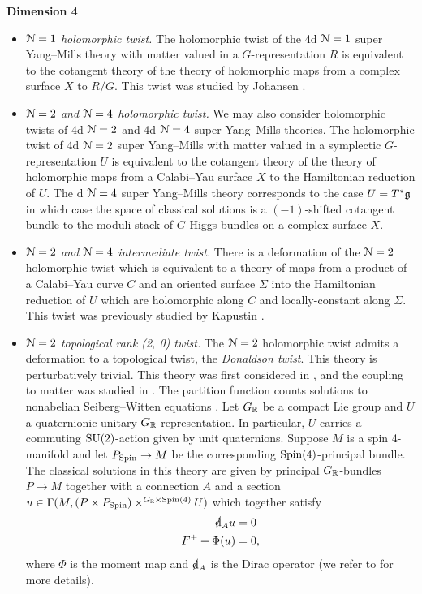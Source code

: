\documentclass[10pt, oneside]{article}
\begin{document}
\textbf{Dimension 4}
\begin{itemize}
 \item \emph{$\mathcal{N}=1$ holomorphic twist.} The holomorphic twist of the 4d $\mathcal N=1$ super Yang--Mills theory with matter valued in a $G$-representation $R$ is equivalent to the cotangent theory of the theory of holomorphic maps from a complex surface $X$ to $R/G$. This twist was studied by Johansen \cite{Johansen}.
 \item \emph{$\mathcal N=2$ and $\mathcal N=4$ holomorphic twist.} We may also consider holomorphic twists of 4d $\mathcal N=2$ and 4d $\mathcal N=4$ super Yang--Mills theories. The holomorphic twist of 4d $\mathcal N=2$ super Yang--Mills with matter valued in a symplectic $G$-representation $U$ is equivalent to the cotangent theory of the theory of holomorphic maps from a Calabi--Yau surface $X$ to the Hamiltonian reduction of $U$. The d $\mathcal N=4$ super Yang--Mills theory corresponds to the case $U=T^*\mathfrak g$ in which case the space of classical solutions is a $(-1)$-shifted cotangent bundle to the moduli stack of $G$-Higgs bundles on a complex surface $X$.
 \item \emph{$\mathcal{N}=2$ and $\mathcal{N}=4$ intermediate twist.} There is a deformation of the $\mathcal N=2$ holomorphic twist which is equivalent to a theory of maps from a product of a Calabi--Yau curve $C$ and an oriented surface $\Sigma$ into the Hamiltonian reduction of $U$ which are holomorphic along $C$ and locally-constant along $\Sigma$. This twist was previously studied by Kapustin \cite{KapustinHolo}.
 \item \emph{$\mathcal{N}=2$ topological rank (2, 0) twist.} The $\mathcal N=2$ holomorphic twist admits a deformation to a topological twist, the \emph{Donaldson twist}. This theory is perturbatively trivial. This theory was first considered in \cite{WittenTQFT}, and the coupling to matter was studied in \cite{AnselmiFre, AlvarezLabastida, HyunParkPark}. The partition function counts solutions to nonabelian Seiberg--Witten equations \cite{Pidstrigach}. Let $G_\mathbb R$ be a compact Lie group and $U$ a quaternionic-unitary $G_\mathbb R$-representation. In particular, $U$ carries a commuting $\mathrm{SU}(2)$-action given by unit quaternions. Suppose $M$ is a spin 4-manifold and let $P_{\mathrm{Spin}}\rightarrow M$ be the corresponding $\mathrm{Spin}(4)$-principal bundle. The classical solutions in this theory are given by principal $G_\mathbb R$-bundles $P\rightarrow M$ together with a connection $A$ and a section $u\in\Gamma(M, (P\times P_{\mathrm{Spin}})\times^{G_\mathbb R\times \mathrm{Spin}(4)} U)$ which together satisfy
\begin{align}
\sd \d_A u &= 0 \label{eq:SW1} \\
F^+ + \Phi(u) &= 0, \label{eq:SW2}
\end{align}
where $\Phi$ is the moment map and $\sd\d_A$ is the Dirac operator (we refer to \cite{Pidstrigach,HaydysDirac} for more details).


\end{itemize}
\end{document}
